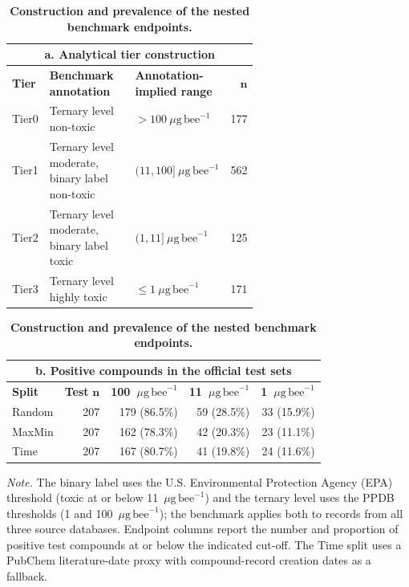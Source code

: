 \documentclass{ieeeaccess}
\newcommand{\ugbee}{\ensuremath{\mu\mathrm{g\,bee}^{-1}}\xspace}
\begin{document}
\begin{table}[!t]
	\centering
	\caption{\textbf{Construction and prevalence of the nested benchmark endpoints.}}
	\label{tab:endpoints}

	\begin{minipage}{0.90\linewidth}
		\centering

		\begin{tabular}{@{}l p{0.38\linewidth} p{0.23\linewidth} r@{}}
			\toprule
			\multicolumn{4}{c}{\textbf{a. Analytical tier construction}} \\
			\midrule
			\textbf{Tier} &
			\textbf{Benchmark annotation} &
			\textbf{Annotation-implied range} &
			$\boldsymbol{n}$ \\
			\midrule
			Tier0 & Ternary level non-toxic & \(>100~\ugbee\) & 177 \\
			Tier1 & Ternary level moderate, binary label non-toxic & \((11,100]~\ugbee\) & 562 \\
			Tier2 & Ternary level moderate, binary label toxic & \((1,11]~\ugbee\) & 125 \\
			Tier3 & Ternary level highly toxic & \(\leq1~\ugbee\) & 171 \\
			\bottomrule
		\end{tabular}

		\vspace{0.9em}

		\begin{tabular}{@{}lrrrr@{}}
			\toprule
			\multicolumn{5}{c}{\textbf{b. Positive compounds in the official test sets}} \\
			\midrule
			\textbf{Split} &
			\textbf{Test} $\boldsymbol{n}$ &
			\textbf{100~\ugbee} &
			\textbf{11~\ugbee} &
			\textbf{1~\ugbee} \\
			\midrule
			Random & 207 & 179 (86.5\%) & 59 (28.5\%) & 33 (15.9\%) \\
			MaxMin & 207 & 162 (78.3\%) & 42 (20.3\%) & 23 (11.1\%) \\
			Time & 207 & 167 (80.7\%) & 41 (19.8\%) & 24 (11.6\%) \\
			\bottomrule
		\end{tabular}

		\vspace{0.5em}

		\footnotesize
		\raggedright
		\textit{Note.}
		The binary label uses the U.S. Environmental Protection Agency (EPA) threshold (toxic at or below 11~\ugbee) and the ternary level uses the PPDB thresholds (1 and 100~\ugbee); the benchmark applies both to records from all three source databases. Endpoint columns report the number and proportion of positive test compounds at or below the indicated cut-off. The Time split uses a PubChem literature-date proxy with compound-record creation dates as a fallback.

	\end{minipage}
\end{table}
\end{document}
